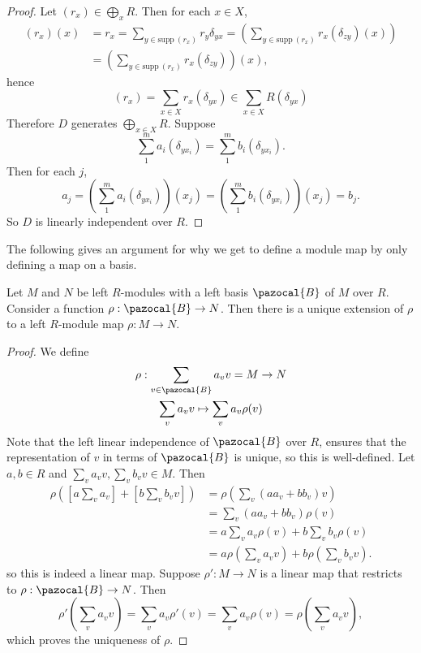 \begin{proof}
    Let $(r_x)\in \bigoplus_x R$. Then for each $x\in X$,
    \begin{align*}
        (r_x)(x) &= r_x = \sum_{y\in \mathrm{supp} \ (r_x)} r_y\delta_{yx} =  \left(\sum_{y\in \mathrm{supp} \ (r_x)}r_x(\delta_{zy})(x)\right)\\ 
        &= \left(\sum_{y\in \mathrm{supp} \ (r_x)}r_x(\delta_{zy})\right)(x), 
    \end{align*}
    hence 
    $$(r_x) = \sum_{x \in X} r_x(\delta_{yx})\in \sum_{x\in X} R(\delta_{yx})$$
    Therefore $D$ generates $\bigoplus_{x\in X} R$. Suppose 
    $$
        \sum_{1}^m a_i(\delta_{yx_i}) = \sum_1^m b_i(\delta_{yx_i}).
    $$
    Then for each $j$,
    $$
        a_j = \left(\sum_{1}^m a_i(\delta_{yx_i})\right)(x_j) = \left(\sum_1^m b_i(\delta_{yx_i})\right)(x_j)=b_j.
    $$
    So $D$ is linearly independent over $R$. 
\end{proof}
The following gives an argument for why we get to define a module map by only defining a map on a basis.
\begin{lemma}
    Let $M$ and $N$ be left $R$-modules with a left basis $\pazocal{B}$ of $M$ over $R$. Consider a function $\rho : \pazocal{B}\rightarrow N$. Then there is a unique extension of $\rho$ to a left $R$-module map $\rho: M\rightarrow N$. 
\end{lemma}
\begin{proof}
    We define 
    \begin{gather*}
        \rho : \sum_{v\in \pazocal{B}} a_v v = M \rightarrow N \\
        \sum_{v} a_v v \mapsto \sum_v a_v\rho(v)
    \end{gather*}
    Note that the left linear independence of $\pazocal{B}$ over $R$, ensures that the representation of $v$ in terms of $\pazocal{B}$ is unique, so this is well-defined. Let $a,b\in R$ and $\sum_{v} a_v v,\sum_{v} b_v v\in M$. Then 
    \begin{align*}
        \rho\left(\left[a\sum_{v}a_v\right] +\left[b\sum_v b_vv \right]\right) &= \rho\left( \sum_v (aa_v+bb_v) v\right)\\ &= \sum_v (aa_v+bb_v)\rho(v)\\ &= a\sum_v a_v \rho(v) + b\sum_v b_v\rho(v)\\ 
        &= a\rho\left(\sum_v a_v v\right)+b\rho\left(\sum_v b_v v\right). 
    \end{align*}
    so this is indeed a linear map. Suppose $\rho' : M\rightarrow N$ is a linear map that restricts to $\rho: \pazocal{B} \rightarrow N$. Then 
    $$
        \rho'\left(\sum_v a_v v\right) = \sum_va_v \rho'(v)=\sum_v a_v \rho(v)= \rho\left(\sum_va_vv\right),
    $$
    which proves the uniqueness of $\rho$.
\end{proof}
